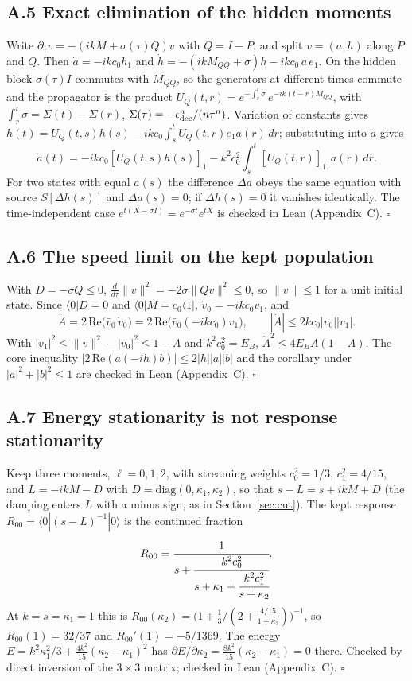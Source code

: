 \documentclass[11pt]{article}
\begin{document}
\subsection*{A.5 Exact elimination of the hidden moments}
Write $\partial_\tau v=-(ikM+\sigma(\tau)Q)v$ with $Q=I-P$, and split $v=(a,h)$ along $P$ and $Q$. Then $\dot a=-ikc_0h_1$ and $\dot h=-(ikM_{QQ}+\sigma)h-ikc_0\,a\,e_1$. On the hidden block $\sigma(\tau)I$ commutes with $M_{QQ}$, so the generators at different times commute and the propagator is the product $U_Q(t,r)=e^{-\int_r^t\sigma}\,e^{-ik(t-r)M_{QQ}}$, with $\int_r^t\sigma=\Sigma(t)-\Sigma(r)$, $\Sigma(\tau)=-\epsilon_{\rm dec}^n/(n\tau^n)$. Variation of constants gives $h(t)=U_Q(t,s)h(s)-ikc_0\int_s^tU_Q(t,r)e_1a(r)\,dr$; substituting into $\dot a$ gives
\[
\dot a(t)=-ikc_0[U_Q(t,s)h(s)]_1-k^2c_0^2\int_s^t[U_Q(t,r)]_{11}a(r)\,dr .
\]
For two states with equal $a(s)$ the difference $\Delta a$ obeys the same equation with source $S[\Delta h(s)]$ and $\Delta a(s)=0$; if $\Delta h(s)=0$ it vanishes identically. The time-independent case $e^{t(X-\sigma I)}=e^{-\sigma t}e^{tX}$ is checked in Lean (Appendix~C). $\square$
\subsection*{A.6 The speed limit on the kept population}
With $D=-\sigma Q\le0$, $\frac{d}{d\tau}\lVert v\rVert^2=-2\sigma\lVert Qv\rVert^2\le0$, so $\lVert v\rVert\le1$ for a unit initial state. Since $\langle0|D=0$ and $\langle0|M=c_0\langle1|$, $\dot v_0=-ikc_0v_1$, and
\[
\dot A=2\,\mathrm{Re}\big(\bar v_0\,\dot v_0\big)=2\,\mathrm{Re}\big(\bar v_0(-ikc_0)v_1\big),\qquad |\dot A|\le2kc_0|v_0||v_1|.
\]
With $|v_1|^2\le\lVert v\rVert^2-|v_0|^2\le1-A$ and $k^2c_0^2=E_B$, $\dot A^2\le4E_BA(1-A)$. The core inequality $|2\,\mathrm{Re}(\bar a(-ih)b)|\le2|h||a||b|$ and the corollary under $|a|^2+|b|^2\le1$ are checked in Lean (Appendix~C). $\square$
\subsection*{A.7 Energy stationarity is not response stationarity}
Keep three moments, $\ell=0,1,2$, with streaming weights $c_0^2=1/3$, $c_1^2=4/15$, and $L=-ikM-D$ with $D=\mathrm{diag}(0,\kappa_1,\kappa_2)$, so that $s-L=s+ikM+D$ (the damping enters $L$ with a minus sign, as in Section~\ref{sec:cut}). The kept response $R_{00}=\langle0|(s-L)^{-1}|0\rangle$ is the continued fraction
\[
R_{00}=\cfrac{1}{s+\cfrac{k^2c_0^2}{s+\kappa_1+\cfrac{k^2c_1^2}{s+\kappa_2}}} .
\]
At $k=s=\kappa_1=1$ this is $R_{00}(\kappa_2)=\big(1+\tfrac13/(2+\tfrac{4/15}{1+\kappa_2})\big)^{-1}$, so $R_{00}(1)=32/37$ and $R_{00}'(1)=-5/1369$. The energy $E=k^2\kappa_1^2/3+\tfrac{4k^2}{15}(\kappa_2-\kappa_1)^2$ has $\partial E/\partial\kappa_2=\tfrac{8k^2}{15}(\kappa_2-\kappa_1)=0$ there. Checked by direct inversion of the $3\times3$ matrix; checked in Lean (Appendix~C). $\square$
\end{document}
